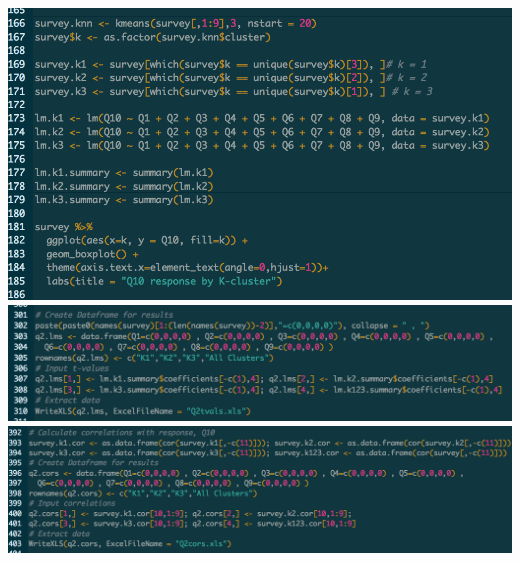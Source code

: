 \documentclass[10pt, oneside,spanish]{article}
\begin{document}
\begin{center}
\includegraphics[width=16cm]{2a1.png}
\includegraphics[width=16cm]{2b0.png}
\includegraphics[width=16cm]{2b00.png}
\end{center}



\end{document}
